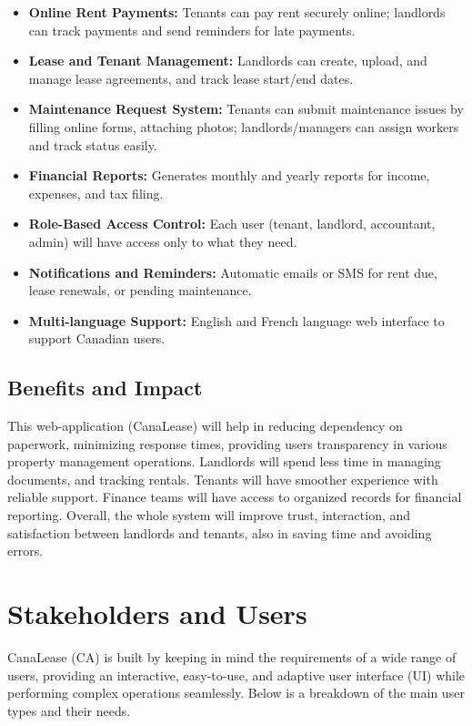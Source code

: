 \documentclass[12pt]{article}
\begin{document}
\begin{itemize}
    \item \textbf{Online Rent Payments:} Tenants can pay rent securely online; landlords can track payments and send reminders for late payments.
    \item \textbf{Lease and Tenant Management:} Landlords can create, upload, and manage lease agreements, and track lease start/end dates.
    \item \textbf{Maintenance Request System:} Tenants can submit maintenance issues by filling online forms, attaching photos; landlords/managers can assign workers and track status easily.
    \item \textbf{Financial Reports:} Generates monthly and yearly reports for income, expenses, and tax filing.
    \item \textbf{Role-Based Access Control:} Each user (tenant, landlord, accountant, admin) will have access only to what they need.
    \item \textbf{Notifications and Reminders:} Automatic emails or SMS for rent due, lease renewals, or pending maintenance.
    \item \textbf{Multi-language Support:} English and French language web interface to support Canadian users.
\end{itemize}

\subsection{Benefits and Impact}
This web-application (CanaLease) will help in reducing dependency on paperwork, minimizing response times, providing users transparency in various property management operations. Landlords will spend less time in managing documents, and tracking rentals. Tenants will have smoother experience with reliable support. Finance teams will have access to organized records for financial reporting. Overall, the whole system will improve trust, interaction, and satisfaction between landlords and tenants, also in saving time and avoiding errors.  

\section{Stakeholders and Users}
CanaLease (CA) is built by keeping in mind the requirements of a wide range of users, providing an interactive, easy-to-use, and adaptive user interface (UI) while performing complex operations seamlessly. Below is a breakdown of the main user types and their needs.
\end{document}
